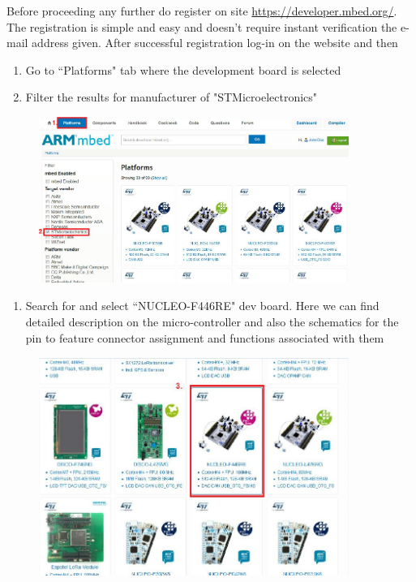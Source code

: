\documentclass[a4paper]{article}
\begin{document}
Before proceeding any further do register on site \url{https://developer.mbed.org/}. The registration is simple and
easy
and doesn't require instant verification the e-mail address given. After successful registration log-in on the website
and then
\begin{enumerate}
    \item Go to ``Platforms" tab where the development board is selected
    \item Filter the results for manufacturer of "STMicroelectronics"
\end{enumerate}
\begin{figure}[H]
    \centering
    \includegraphics[width=0.9\textwidth]{figures/mbed-platform.png}
\end{figure}
\begin{enumerate}[resume]
    \item Search for and select ``NUCLEO-F446RE" dev board. Here we can find detailed description on the
          micro-controller
          and also the schematics for the pin to feature connector assignment and functions associated with them
\end{enumerate}
\begin{figure}[H]
    \centering
    \includegraphics[width=0.9\textwidth]{figures/mbed-nucleo.png}
\end{figure}
\end{document}
